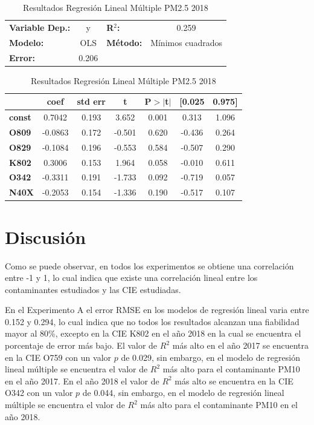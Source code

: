 \begin{table}[hbt!]
\caption{Resultados Regresión Lineal Múltiple PM2.5 2018}
\label{tab:RRLM PM2.5 2018}
\begin{center}
\begin{tabular}{lclc}
\toprule
\textbf{Variable Dep.:}    &        y         & \textbf{  R$^2$:         } &     0.259   \\
\textbf{Modelo:}            &       OLS        & \textbf{Método:}           &  Mínimos cuadrados   \\
\textbf{Error:}            & 0.206  \\
\bottomrule
\end{tabular}
\begin{tabular}{lcccccc}
               & \textbf{coef} & \textbf{std err} & \textbf{t} & \textbf{P$> |$t$|$} & \textbf{[0.025} & \textbf{0.975]}  \\
\midrule
\textbf{const} &       0.7042  &        0.193     &     3.652  &         0.001        &        0.313    &        1.096     \\
\textbf{O809}  &      -0.0863  &        0.172     &    -0.501  &         0.620        &       -0.436    &        0.264     \\
\textbf{O829}  &      -0.1084  &        0.196     &    -0.553  &         0.584        &       -0.507    &        0.290     \\
\textbf{K802}  &       0.3006  &        0.153     &     1.964  &         0.058        &       -0.010    &        0.611     \\
\textbf{O342}  &      -0.3311  &        0.191     &    -1.733  &         0.092        &       -0.719    &        0.057     \\
\textbf{N40X}  &      -0.2053  &        0.154     &    -1.336  &         0.190        &       -0.517    &        0.107     \\
\bottomrule
\end{tabular}
\end{center}
\end{table}


\clearpage
\section{Discusión}
Como se puede observar, en todos los experimentos se obtiene una correlación entre -1 y 1, lo cual indica que existe una correlación lineal entre los contaminantes estudiados y las CIE estudiadas.

En el Experimento A el error RMSE en los modelos de regresión lineal varia entre 0.152 y 0.294, lo cual indica que no todos los resultados alcanzan una fiabilidad mayor al 80\%, excepto en la CIE \citep{r9} K802 en el año 2018 en la cual se encuentra el porcentaje de error más bajo. 
El valor de $R^2$ más alto en el año 2017 se encuentra en la CIE O759 con un valor $p$ de 0.029, sin embargo, en el modelo de regresión lineal múltiple se encuentra el valor de $R^2$ más alto para el contaminante PM10 en el año 2017. En el año 2018 el valor de $R^2$ más alto se encuentra en la CIE O342 con un valor $p$ de 0.044, sin embargo, en el modelo de regresión lineal múltiple se encuentra el valor de $R^2$ más alto para el contaminante PM10 en el año 2018.

